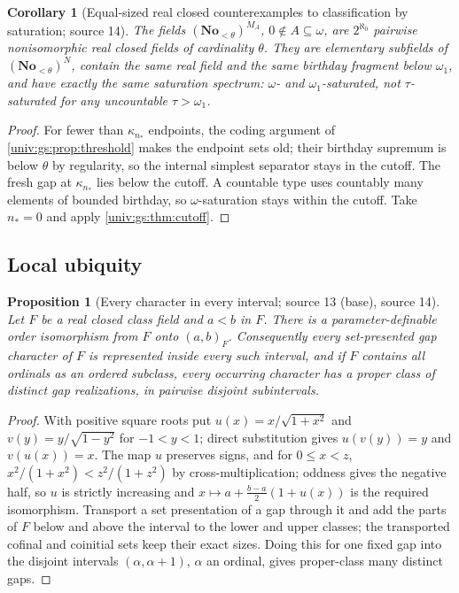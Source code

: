 \documentclass[11pt,letterpaper]{article}
\numberwithin{equation}{section}
\newtheorem{proposition}[proposition]{Proposition}
\newtheorem{corollary}[corollary]{Corollary}
\theoremstyle{definition}
\theoremstyle{remark}
\newcommand{\No}{\mathbf{No}}
\begin{document}
\begin{corollary}[Equal-sized real closed counterexamples to classification by saturation; source 14]\label{univ:gs:cor:setfields}
The fields $(\No_{<\theta})^{M_A}$, $0\notin A\subseteq\omega$, are $2^{\aleph_0}$ pairwise
nonisomorphic real closed fields of cardinality $\theta$. They are elementary subfields of
$(\No_{<\theta})^N$, contain the same real field and the same birthday fragment below
$\omega_1$, and have exactly the same saturation spectrum: $\omega$- and
$\omega_1$-saturated, not $\tau$-saturated for any uncountable $\tau>\omega_1$.
\end{corollary}
\begin{proof}
For fewer than $\kappa_{n_*}$ endpoints, the coding argument of
\cref{univ:gs:prop:threshold} makes the endpoint sets old; their birthday supremum is below
$\theta$ by regularity, so the internal simplest separator stays in the cutoff. The fresh
gap at $\kappa_{n_*}$ lies below the cutoff. A countable type uses countably many elements
of bounded birthday, so $\omega$-saturation stays within the cutoff. Take $n_*=0$ and apply
\cref{univ:gs:thm:cutoff}.
\end{proof}

\subsection{Local ubiquity}

\begin{proposition}[Every character in every interval; source 13 (base), source 14]\label{univ:gs:prop:ubiquity}
Let $F$ be a real closed class field and $a<b$ in $F$. There is a parameter-definable order
isomorphism from $F$ onto $(a,b)_F$. Consequently every set-presented gap character of $F$
is represented inside every such interval, and if $F$ contains all ordinals as an ordered
subclass, every occurring character has a proper class of distinct gap realizations,
in pairwise disjoint subintervals.
\end{proposition}
\begin{proof}
With positive square roots put $u(x)=x/\sqrt{1+x^2}$ and $v(y)=y/\sqrt{1-y^2}$ for
$-1<y<1$; direct substitution gives $u(v(y))=y$ and $v(u(x))=x$. The map $u$ preserves signs,
and for $0\le x<z$, $x^2/(1+x^2)<z^2/(1+z^2)$ by cross-multiplication; oddness gives the
negative half, so $u$ is strictly increasing and $x\mapsto a+\frac{b-a}2(1+u(x))$ is the
required isomorphism. Transport a set presentation of a gap through it and add the parts of
$F$ below and above the interval to the lower and upper classes; the transported cofinal and
coinitial sets keep their exact sizes. Doing this for one fixed gap into the disjoint
intervals $(\alpha,\alpha+1)$, $\alpha$ an ordinal, gives proper-class many distinct gaps.
\end{proof}
\end{document}
